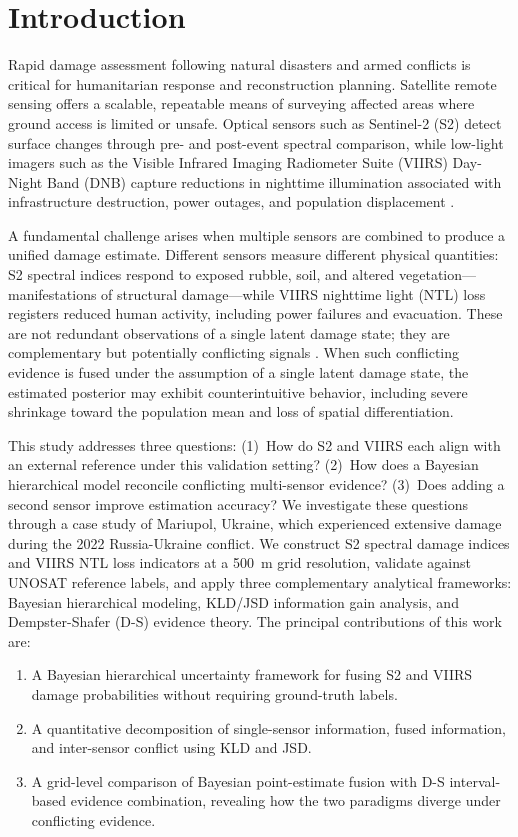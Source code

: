 \documentclass[wcp]{jmlr}
\begin{document}
\section{Introduction}\label{sec:intro}

Rapid damage assessment following natural disasters and armed conflicts is
critical for humanitarian response and reconstruction planning. Satellite
remote sensing offers a scalable, repeatable means of surveying affected
areas where ground access is limited or unsafe. Optical sensors such as
Sentinel-2 (S2) detect surface changes through pre- and post-event spectral
comparison, while low-light imagers such as the Visible Infrared Imaging
Radiometer Suite (VIIRS) Day-Night Band (DNB) capture reductions in
nighttime illumination associated with infrastructure destruction,
power outages, and population displacement \cite{roman2018,zhang2023}.

A fundamental challenge arises when multiple sensors are combined to produce
a unified damage estimate. Different sensors measure different physical
quantities: S2 spectral indices respond to exposed rubble, soil, and altered
vegetation---manifestations of structural damage---while VIIRS nighttime
light (NTL) loss registers reduced human activity, including power failures
and evacuation. These are not redundant observations of a single latent
damage state; they are complementary but potentially conflicting signals
\cite{xiao2024}. When such conflicting evidence is fused under the
assumption of a single latent damage state, the estimated posterior may
exhibit counterintuitive behavior, including severe shrinkage toward the
population mean and loss of spatial differentiation.

This study addresses three questions: (1)~How do S2 and VIIRS each align
with an external reference under this validation setting? (2)~How does a
Bayesian hierarchical model reconcile conflicting multi-sensor evidence?
(3)~Does adding a second sensor improve estimation accuracy?
We investigate these questions through a case study of Mariupol, Ukraine,
which experienced extensive damage during the 2022 Russia-Ukraine conflict.
We construct S2 spectral damage indices and VIIRS NTL loss indicators at a
500~m grid resolution, validate against UNOSAT reference labels, and apply
three complementary analytical frameworks: Bayesian hierarchical modeling,
KLD/JSD information gain analysis, and Dempster-Shafer (D-S) evidence
theory. The principal contributions of this work are:

\begin{enumerate}
  \item A Bayesian hierarchical uncertainty framework for fusing S2 and
    VIIRS damage probabilities without requiring ground-truth labels.
  \item A quantitative decomposition of single-sensor information, fused
    information, and inter-sensor conflict using KLD and JSD.
  \item A grid-level comparison of Bayesian point-estimate fusion with D-S
    interval-based evidence combination, revealing how the two paradigms
    diverge under conflicting evidence.
\end{enumerate}
\end{document}
